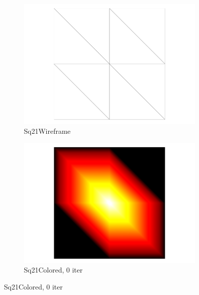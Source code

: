 \documentclass[openany]{book}
\begin{document}
\begin{figure}
	\centering
	\begin{subfigure}{.48\linewidth}
		\centering
		\includegraphics[width=0.48\linewidth]{data/synthetic_meshes/square_tesselation_2tri_Dirac_delta_1_v9_f8_wireframe.png}
		\caption{Sq21Wireframe}\label{fig:sq2.a}
	\end{subfigure}
	\begin{subfigure}{.48\linewidth}
		\centering
		\includegraphics[width=0.48\linewidth]{data/synthetic_meshes/square_tesselation_2tri_Dirac_delta_1_v9_f8_funcvals.png}
		\caption{Sq21Colored, 0 iter}\label{fig:sq2.b}
	\end{subfigure}


\end{figure}
\end{document}
